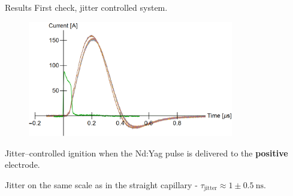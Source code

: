 \documentclass[draft]{beamer}
\begin{document}
  \begin{frame}{Results}
    First check, jitter controlled system.
    \begin{figure}
      \includegraphics[width=0.8\textwidth]{figures/results/2stageCapillary/low_jitter_curved_capillary.png}
    \end{figure}
    Jitter--controlled ignition when the Nd:Yag pulse is delivered to the \textbf{positive} electrode.

    Jitter on the same scale as in the straight capillary - $\tau_\text{jitter}\approx 1\pm \SI{0.5}{\ns}$.
  \end{frame}
\end{document}
